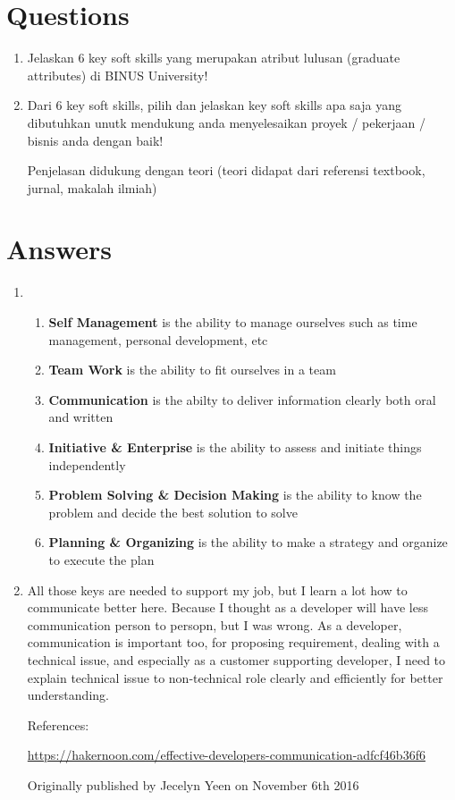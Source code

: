 \documentclass[12pt, letterpaper]{article}
\begin{document}
\section*{Questions}
\begin{enumerate}
    \item Jelaskan 6 key soft skills yang merupakan atribut lulusan (graduate attributes) di BINUS University!
    \item Dari 6 key soft skills, pilih dan jelaskan key soft skills apa saja yang dibutuhkan unutk mendukung anda menyelesaikan proyek / pekerjaan / bisnis anda dengan baik!
        
        Penjelasan didukung dengan teori (teori didapat dari referensi textbook, jurnal, makalah ilmiah)
\end{enumerate}

\section*{Answers}
\begin{enumerate}
    \item
        \begin{enumerate}
            \item \textbf{Self Management} is the ability to manage ourselves such as time management, personal development, etc
            \item \textbf{Team Work} is the ability to fit ourselves in a team
            \item \textbf{Communication} is the abilty to deliver information clearly both oral and written
            \item \textbf{Initiative \& Enterprise} is the ability to assess and initiate things independently
            \item \textbf{Problem Solving \& Decision Making} is the ability to know the problem and decide the best solution to solve
            \item \textbf{Planning \& Organizing} is the ability to make a strategy and organize to execute the plan
        \end{enumerate}

    \item All those keys are needed to support my job, but I learn a lot how to communicate better here. Because I thought as a developer will have less communication person to persopn, but I was wrong. As a developer, communication is important too, for proposing requirement, dealing with a technical issue, and especially as a customer supporting developer, I need to explain technical issue to non-technical role clearly and efficiently for better understanding.

        References:
        
        \url{https://hakernoon.com/effective-developers-communication-adfcf46b36f6}

        Originally published by Jecelyn Yeen on November 6th 2016

\end{enumerate}
\end{document}
